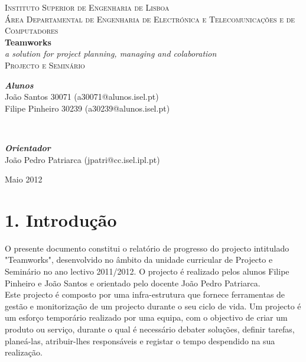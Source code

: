 \documentclass[]{article}
\begin{document}
\begin{titlepage}
\begin{center}
\textsc{\large Instituto Superior de Engenharia de Lisboa}\\[0.4cm]
\textsc{\large Área Departamental de Engenharia de Electrónica e Telecomunicações e de Computadores }\\[4cm]
{ \Huge \bfseries Teamworks}\\[1cm]
{ \Large \emph{a solution for project planning, managing and colaboration} }\\[1cm]
\textsc{\large Projecto e Seminário}\\[3cm]
\begin{minipage}{1\textwidth}
\begin{flushleft} \large
\textbf{\emph{Alunos}}\\
João Santos 30071 (a30071@alunos.isel.pt) \\
Filipe Pinheiro 30239 (a30239@alunos.isel.pt)
\end{flushleft}
\end{minipage}\\[0.5cm]
\begin{minipage}{1\textwidth}
\begin{flushright} \large
\textbf{\emph{Orientador}}\\
João Pedro Patriarca (jpatri@cc.isel.ipl.pt)
\end{flushright}
\end{minipage}
\vfill
{\large Maio 2012}
\end{center}
\end{titlepage}
\tableofcontents
\newpage
\section{1. Introdução}
O presente documento constitui o relatório de progresso do projecto intitulado "Teamworks", desenvolvido no âmbito da unidade curricular de Projecto e Seminário no ano lectivo 2011/2012. O projecto é realizado pelos alunos Filipe Pinheiro e João Santos e orientado pelo docente João Pedro Patriarca.\\

Este projecto é composto por uma infra-estrutura que fornece ferramentas de gestão e monitorização de um projecto durante o seu ciclo de vida. Um projecto é um esforço temporário realizado por uma equipa, com o objectivo de criar um produto ou serviço, durante o qual é necessário debater soluções, definir tarefas, planeá-las, atribuir-lhes responsáveis e registar o tempo despendido na sua realização.\\
\end{document}
